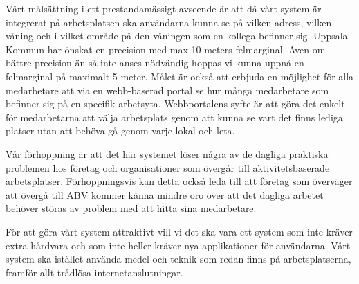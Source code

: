 \documentclass[swedish, a4paper,12pt]{article}
\begin{document}
Vårt målsättning i ett prestandamässigt avseende är att då vårt system är integrerat på arbetsplatsen ska användarna kunna se på vilken adress, vilken våning och i vilket område på den våningen som en kollega befinner sig. Uppsala Kommun har önskat en precision med max 10 meters felmarginal. Även om bättre precision än så inte anses nödvändig hoppas vi kunna uppnå en felmarginal på maximalt 5 meter. Målet är också att erbjuda en möjlighet för alla medarbetare att via en webb-baserad portal se hur många medarbetare som befinner sig på en specifik arbetsyta. Webbportalens syfte är att göra det enkelt för medarbetarna att välja arbetsplats genom att kunna se vart det finns lediga platser utan att behöva gå genom varje lokal och leta.

Vår förhoppning är att det här systemet löser några av de dagliga praktiska problemen hos företag och organisationer som övergår till aktivitetsbaserade arbetsplatser. Förhoppningsvis kan detta också leda till att företag som överväger att övergå till ABV kommer känna mindre oro över att det dagliga arbetet behöver störas av problem med att hitta sina medarbetare.

För att göra vårt system attraktivt vill vi det ska vara ett system som inte kräver extra hårdvara och som inte heller kräver nya applikationer för användarna. Vårt system ska istället använda medel och teknik som redan finns på arbetsplatserna, framför allt trådlösa internetanslutningar.








\end{document}
